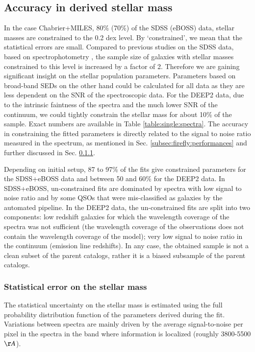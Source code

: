 \documentclass[onecolumn]{aa}
\begin{document}
\subsection{Accuracy in derived stellar mass}
\label{subsec:about:convergence}
In the case Chabrier+MILES, 80\% (70\%) of the SDSS (eBOSS) data, stellar masses are constrained to the 0.2 dex level. 
By `constrained', we mean that the statistical errors are small. 
Compared to previous studies on the SDSS data, based on spectrophotometry \citep[e.g.][]{Maraston2013}, the sample size of galaxies with stellar masses constrained to this level is increased by a factor of 2. 
Therefore we are gaining significant insight on the stellar population parameters. 
Parameters based on broad-band SEDs on the other hand could be calculated for all data as they are less dependent on the SNR of the spectroscopic data. 
For the DEEP2 data, due to the intrinsic faintness of the spectra and the much lower SNR of the continuum, we could tightly constrain the stellar mass for about 10\% of the sample.
Exact numbers are available in Table \ref{table:single:spectra}. 
The accuracy in constraining the fitted parameters is directly related to the signal to noise ratio measured in the spectrum, as mentioned in Sec. \ref{subsec:firefly:performances} and further discussed in Sec. \ref{subsec:stat:err}. 

Depending on initial setup, 87 to 97\% of the fits give constrained parameters for the SDSS+eBOSS data and between 50 and 60\% for the DEEP2 data. 
In SDSS+eBOSS, un-constrained fits are dominated by spectra with low signal to noise ratio and by some QSOs that were mis-classified as galaxies by the automated pipeline. %
In the DEEP2 data, the un-constrained fits are split into two components: low redshift galaxies for which the wavelength coverage of the spectra was not sufficient (the wavelength coverage of the observations does not contain the wavelength coverage of the model); very low signal to noise ratio in the continuum (emission line redshifts). 
In any case, the obtained sample is not a clean subset of the parent catalogs, rather it is a biased subsample of the parent catalogs.

\subsubsection{Statistical error on the stellar mass}
\label{subsec:stat:err}
The statistical uncertainty on the stellar mass is estimated using the full probability distribution function of the parameters derived during the fit. 
Variations between spectra are mainly driven by the average signal-to-noise per pixel in the spectra in the band where information is localized (roughly 3800-5500$\AA$). 
\end{document}
